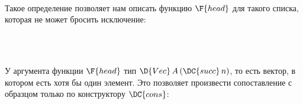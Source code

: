 \begin{code}\>\<%
\\
\>  \<%
\\
\>  \AgdaSymbol{:}  \<%
\\
\>[0]\<[2]%
\>[2] \AgdaSymbol{:} \<%
\\
\>[0]\<[2]%
\>[2] \AgdaSymbol{:}   \<%
\\
\>   \AgdaSymbol{:}    \<%
\\
\>[0]\<[2]%
\>[2] \<[7]%
\>[7]\AgdaSymbol{:}   \<%
\\
\>[0]\<[2]%
\>[2] \AgdaSymbol{:}  \AgdaSymbol{\{}\AgdaSymbol{\}}          \AgdaSymbol{(} \AgdaSymbol{)}\<%
\\
\>\<\end{code}

Такое определение позволяет нам описать функцию $ \F{head} $ для такого списка, которая не может бросить исключение:
\begin{code}\>\<%
\\
\> \AgdaSymbol{:}  \AgdaSymbol{\{}\AgdaSymbol{\}} \AgdaSymbol{\{}\AgdaSymbol{\}}    \AgdaSymbol{(} \AgdaSymbol{)}  \<%
\\
\>\<\end{code}
У аргумента функции $ \F{head} $ тип $ \D{Vec}\,A\,(\DC{succ}\,n) $, то есть вектор, в котором есть хотя бы один элемент.
Это позволяет произвести сопоставление с образцом только по конструктору $ \DC{cons} $:
\begin{code}\>\<%
\\
\> \AgdaSymbol{(}  \AgdaSymbol{)} \AgdaSymbol{=} \<%
\\
\>\<\end{code}
